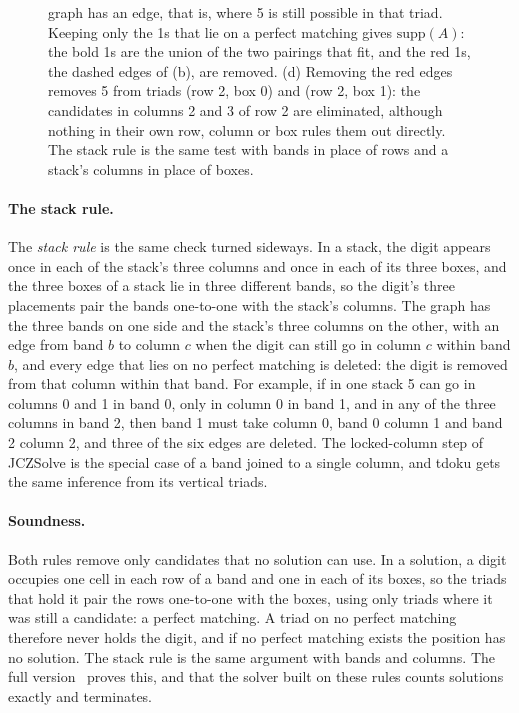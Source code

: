 \documentclass[11pt]{article}
\theoremstyle{definition}
\theoremstyle{plain}
\begin{document}
\begin{figure}[tbp]
{graph has an edge, that is, where 5 is still possible in that triad. Keeping only the 1s that lie on a perfect
matching gives $\mathrm{supp}(A)$: the bold 1s are the union of the two pairings that fit, and the red 1s, the dashed
edges of (b), are removed. (d) Removing the red edges removes 5 from triads (row 2, box 0) and (row 2, box 1): the
candidates in columns 2 and 3 of row 2 are eliminated, although nothing in their own row, column or box rules them
out directly. The stack rule is the same test with bands in place of rows and a stack's
columns in place of boxes.}
\label{fig:band}
\end{figure}

\paragraph{The stack rule.} The \emph{stack rule} is the same check turned sideways. In a stack, the digit appears once
in each of the stack's three columns and once in each of its three boxes, and the three boxes of a stack lie in three
different bands, so the digit's three placements pair the bands one-to-one with the stack's columns. The graph has the
three bands on one side and the stack's three columns on the other, with an edge from band $b$ to column $c$ when the
digit can still go in column $c$ within band $b$, and every edge that lies on no perfect matching is deleted: the digit
is removed from that column within that band. For example, if in one stack 5 can go in columns 0 and 1 in band 0, only
in column 0 in band 1, and in any of the three columns in band 2, then band 1 must take column 0, band 0 column 1 and
band 2 column 2, and three of the six edges are deleted. The locked-column step of JCZSolve is the special case of a
band joined to a single column, and tdoku gets the same inference from its vertical triads.

\paragraph{Soundness.} Both rules remove only candidates that no solution can use. In a solution, a digit occupies
one cell in each row of a band and one in each of its boxes, so the triads that hold it pair the rows one-to-one with
the boxes, using only triads where it was still a candidate: a perfect matching. A triad on no perfect matching
therefore never holds the digit, and if no perfect matching exists the position has no solution. The stack rule is the
same argument with bands and columns. The full version~\cite{kelly2026full} proves this, and that the solver built on
these rules counts solutions exactly and terminates.
\end{document}
